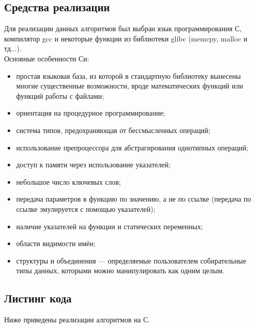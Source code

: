 \documentclass[a4paper,12pt]{article}
\begin{document}
\newpage
\subsection{Средства реализации}
Для реализации данных алгоритмов был выбран язык программирования С, компилятор gcc и некоторые функции из библиотеки glibc (memcpy, malloc и тд...). \\
Основные особенности Си:
\begin{itemize}
\item простая языковая база, из которой в стандартную библиотеку вынесены многие существенные возможности, вроде математических функций или функций работы с файлами;
\item ориентация на процедурное программирование;
\item система типов, предохраняющая от бессмысленных операций;
\item использование препроцессора для абстрагирования однотипных операций;
\item доступ к памяти через использование указателей;
\item небольшое число ключевых слов;
\item передача параметров в функцию по значению, а не по ссылке (передача по ссылке эмулируется с помощью указателей);
\item наличие указателей на функции и статических переменных;
\item области видимости имён;
\item структуры и объединения — определяемые пользователем собирательные типы данных, которыми можно манипулировать как одним целым.
\end{itemize}

\newpage
\subsection{Листинг кода}
Ниже приведены реализации алгоритмов на С.\\

\newpage

\end{document}
